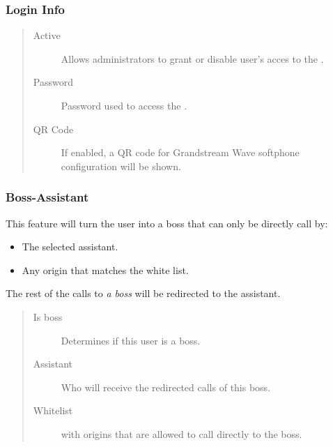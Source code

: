 \documentclass[letterpaper,10pt,spanish]{sphinxmanual}
\begin{document}
\subsubsection{Login Info}
\label{administration_portal/client/vpbx/users:login-info}\begin{quote}
\begin{description}
\item[{Active}] \leavevmode
Allows administrators to grant or disable user's acces to the
{\hyperref[user_portal/index:userportal]{}}.

\item[{Password}] \leavevmode
Password used to access the {\hyperref[user_portal/index:userportal]{}}.

\item[{QR Code}] \leavevmode
If enabled, a QR code for Grandstream Wave softphone configuration
will be shown.

\end{description}
\end{quote}


\subsubsection{Boss-Assistant}
\label{administration_portal/client/vpbx/users:boss-assistant}
This feature will turn the user into a boss that can only be directly call by:
\begin{itemize}
\item {} 
The selected assistant.

\item {} 
Any origin that matches the white list.

\end{itemize}

The rest of the calls to \emph{a boss} will be redirected to the assistant.
\begin{quote}
\begin{description}
\item[{Is boss}] \leavevmode
Determines if this user is a boss.

\item[{Assistant}] \leavevmode
Who will receive the redirected calls of this boss.

\item[{Whitelist}] \leavevmode
{\hyperref[administration_portal/client/vpbx/routing_tools/match_lists:match\string-lists]{}} with origins that are allowed to call directly to
the boss.

\end{description}
\end{quote}
\end{document}
